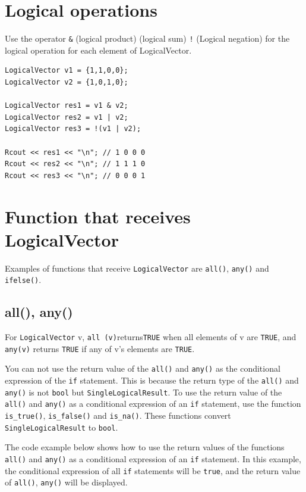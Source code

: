\documentclass[]{book}
\begin{document}
\hypertarget{logical-operations-1}{%
\section{Logical operations}\label{logical-operations-1}}

Use the operator \texttt{\&} (logical product) \texttt{\textbar{}} (logical sum) \texttt{!} (Logical negation) for the logical operation for each element of LogicalVector.

\begin{verbatim}
LogicalVector v1 = {1,1,0,0};
LogicalVector v2 = {1,0,1,0};

LogicalVector res1 = v1 & v2;
LogicalVector res2 = v1 | v2;
LogicalVector res3 = !(v1 | v2);

Rcout << res1 << "\n"; // 1 0 0 0
Rcout << res2 << "\n"; // 1 1 1 0
Rcout << res3 << "\n"; // 0 0 0 1
\end{verbatim}

\hypertarget{function-that-receives-logicalvector}{%
\section{Function that receives LogicalVector}\label{function-that-receives-logicalvector}}

Examples of functions that receive \texttt{LogicalVector} are \texttt{all()}, \texttt{any()} and \texttt{ifelse()}.

\hypertarget{all-any}{%
\subsection{all(), any()}\label{all-any}}

For \texttt{LogicalVector} v, \texttt{all\ (v)}returns\texttt{TRUE} when all elements of v are \texttt{TRUE}, and \texttt{any(v)} returns \texttt{TRUE} if any of v's elements are \texttt{TRUE}.

You can not use the return value of the \texttt{all()} and \texttt{any()} as the conditional expression of the \texttt{if} statement. This is because the return type of the \texttt{all()} and \texttt{any()} is not \texttt{bool} but \texttt{SingleLogicalResult}. To use the return value of the \texttt{all()} and \texttt{any()} as a conditional expression of an \texttt{if} statement, use the function \texttt{is\_true()}, \texttt{is\_false()} and \texttt{is\_na()}. These functions convert \texttt{SingleLogicalResult} to \texttt{bool}.

The code example below shows how to use the return values of the functions \texttt{all()} and \texttt{any()} as a conditional expression of an \texttt{if} statement. In this example, the conditional expression of all \texttt{if} statements will be \texttt{true}, and the return value of \texttt{all()}, \texttt{any()} will be displayed.
\end{document}
